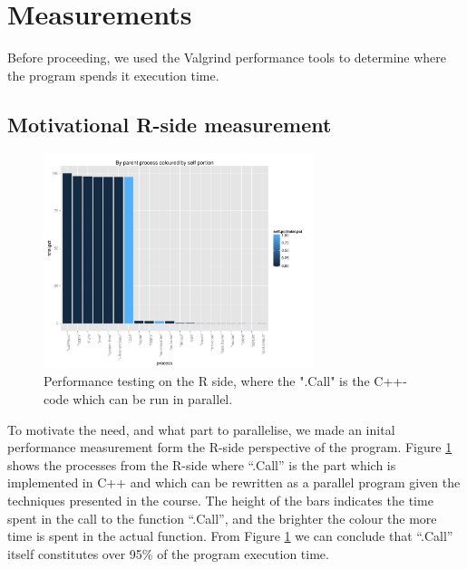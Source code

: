 

\section{Measurements}

Before proceeding, we used the Valgrind performance tools to determine
where the program spends it execution time.

\subsection{Motivational R-side measurement}

\begin{figure}[!htbp] \centering
  \includegraphics[width=0.7\textwidth]{images/parentColByPortion.pdf}
  \caption{Performance testing on the R side, where the ".Call" is the
C++-code which can be run in parallel.}
  \label{fig:rMot}
\end{figure}

To motivate the need, and what part to parallelise, we made an inital
performance measurement form the R-side perspective of the
program. Figure \ref{fig:rMot} shows the processes from the R-side
where ``.Call'' is the part which is implemented in C++ and which can
be rewritten as a parallel program given the techniques presented in
the course. The height of the bars indicates the time spent in the
call to the function ``.Call'', and the brighter the colour the more
time is spent in the actual function. From Figure \ref{fig:rMot} we
can conclude that ``.Call'' itself constitutes over 95\% of the
program execution time.

